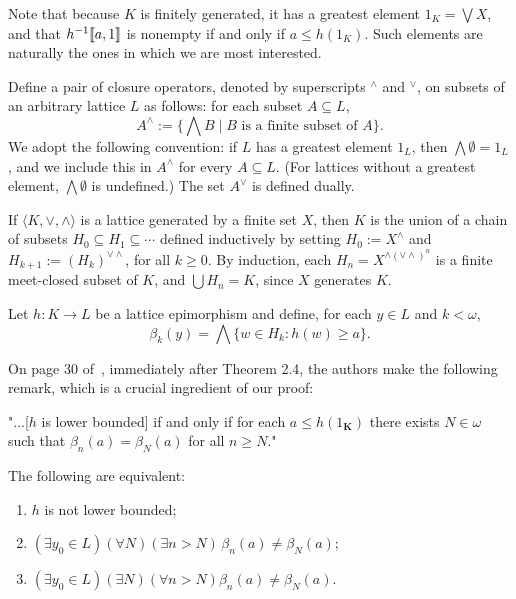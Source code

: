 Note that because $K$ is finitely generated, it has a greatest element
$1_K = \bigvee X$, and that
$h^{-1}\llbracket a, 1 \rrbracket$
is nonempty if and only if $a \leq h(1_K)$.
Such elements are naturally the ones in which we are most interested.

Define a pair of closure operators, 
denoted by superscripts $^\wedge$ and $^\vee$, on  subsets of an arbitrary 
lattice %
$L$ as follows: for each subset $A\subseteq L$,
\[
A^\wedge := \{\bigwedge B \mid B \text{ is a finite subset of } A\}.
\]
We adopt the following convention: if 
$L$ has a greatest element 
$1_{L}$, then $\bigwedge \emptyset = 1_{L}$, and we include 
this in $A^\wedge$ for every $A \subseteq L$. (For lattices without a greatest 
element, $\bigwedge \emptyset$ is undefined.)  
The set $A^\vee$ is defined dually.

If $\langle K, \vee, \wedge\rangle$ is a lattice generated by a 
finite set $X$, then $K$ is the union of a chain of subsets 
$H_0\subseteq H_1 \subseteq \cdots$ defined inductively by setting 
$H_0 := X^\wedge$ and $H_{k+1} := (H_k)^{\vee \wedge}$, for all $k\geqslant 0$. 
By induction, each $H_n = X^{\wedge(\vee\wedge)^n}$ is a finite meet-closed 
subset of $K$, and $\bigcup H_n = K$, since $X$  generates $K$.

Let $h \colon K \to L$ be a lattice epimorphism and define, 
for each $y \in L$ and $k< \omega$, 
\[
\beta_k(y) = \bigwedge \{w \in H_k : h(w) \geqslant a\}.
\]

On page 30 of~\cite{MR1319815}, immediately after Theorem 2.4, the authors make 
the following remark, which is a crucial ingredient of our proof:

"...[$h$ is lower bounded] if and only if for each $a \leqslant h(1_{\mathbf K})$ 
there exists $N\in \omega$ such that $\beta_n(a) = \beta_N(a)$ for all $n\geqslant N$."

\begin{fact}
\label{fact:1}
The following are equivalent:
\begin{enumerate}
\item $h$ is not lower bounded;
\item $(\exists y_0 \in L)(\forall N)(\exists n> N)\, \beta_n(a) \neq \beta_N(a)$;
\item $(\exists y_0 \in L)(\exists N)(\forall n> N) \beta_n(a) \neq \beta_N(a)$.
\end{enumerate}
  \end{fact}

